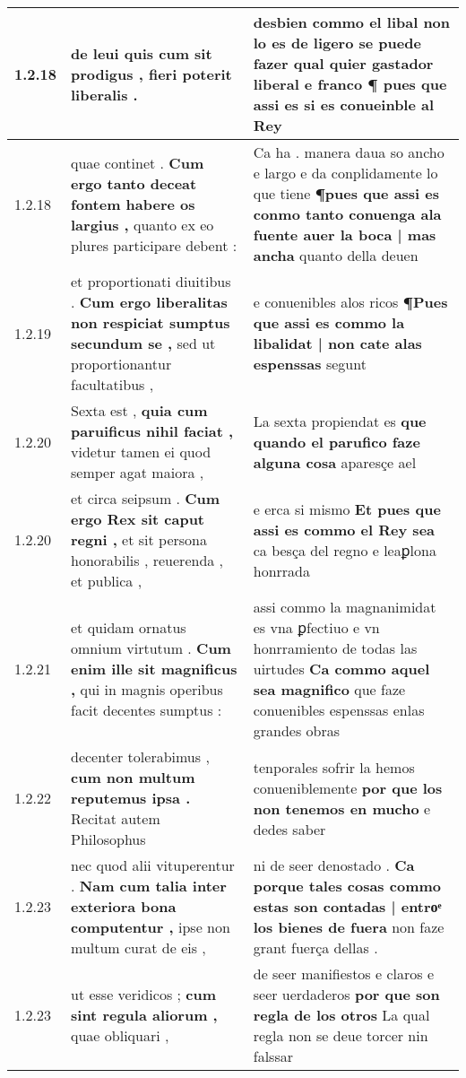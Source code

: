 \begin{tabular}{|p{1cm}|p{6.5cm}|p{6.5cm}|}
1.2.18 & de leui \textbf{ quis cum sit prodigus , } fieri poterit liberalis . & desbien commo el libal non lo es de ligero se puede fazer \textbf{ qual quier gastador liberal e franco ¶ } pues que assi es si es conueinble al Rey \\\hline
1.2.18 & quae continet . \textbf{ Cum ergo tanto deceat fontem habere os largius , } quanto ex eo plures participare debent : & Ca ha . manera daua so ancho e largo e da conplidamente lo que tiene \textbf{ ¶pues que assi es conmo tanto conuenga ala fuente auer la boca | mas ancha } quanto della deuen \\\hline
1.2.19 & et proportionati diuitibus . \textbf{ Cum ergo liberalitas non respiciat sumptus secundum se , } sed ut proportionantur facultatibus , & e conuenibles alos ricos \textbf{ ¶Pues que assi es commo la libalidat | non cate alas espenssas } segunt \\\hline
1.2.20 & Sexta est , \textbf{ quia cum paruificus nihil faciat , } videtur tamen ei quod semper agat maiora , & La sexta propiendat es \textbf{ que quando el parufico faze alguna cosa } aparesçe ael \\\hline
1.2.20 & et circa seipsum . \textbf{ Cum ergo Rex sit caput regni , } et sit persona honorabilis , reuerenda , et publica , & e erca si mismo \textbf{ Et pues que assi es commo el Rey sea } ca besça del regno e leaꝑlona honrrada \\\hline
1.2.21 & et quidam ornatus omnium virtutum . \textbf{ Cum enim ille sit magnificus , } qui in magnis operibus facit decentes sumptus : & assi commo la magnanimidat es vna ꝑfectiuo e vn honrramiento de todas las uirtudes \textbf{ Ca commo aquel sea magnifico } que faze conuenibles espenssas enlas grandes obras \\\hline
1.2.22 & decenter tolerabimus , \textbf{ cum non multum reputemus ipsa . } Recitat autem Philosophus & tenporales sofrir la hemos conueniblemente \textbf{ por que los non tenemos en mucho } e dedes saber \\\hline
1.2.23 & nec quod alii vituperentur . \textbf{ Nam cum talia inter exteriora bona computentur , } ipse non multum curat de eis , & ni de seer denostado . \textbf{ Ca porque tales cosas commo estas son contadas | entroͤ los bienes de fuera } non faze grant fuerça dellas . \\\hline
1.2.23 & ut esse veridicos ; \textbf{ cum sint regula aliorum , } quae obliquari , & de seer manifiestos e claros e seer uerdaderos \textbf{ por que son regla de los otros } La qual regla non se deue torcer nin falssar \\\hline

\end{tabular}
